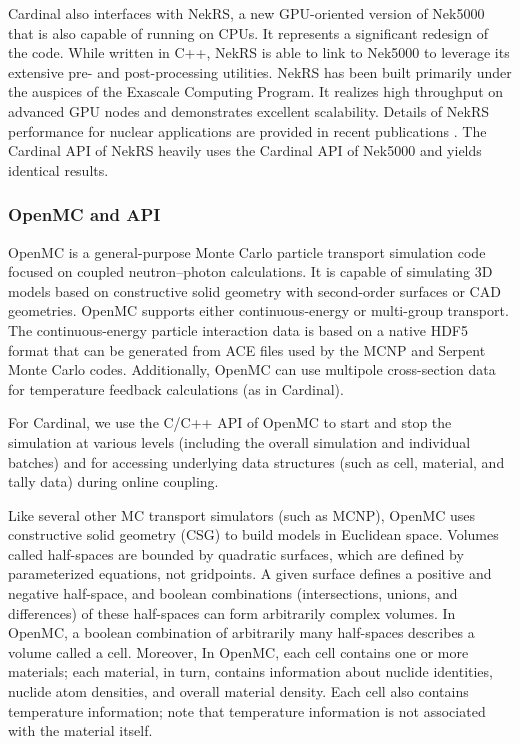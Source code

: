 Cardinal also interfaces with NekRS, a new GPU-oriented version of Nek5000
that is also capable of running on CPUs. It represents a significant redesign
of the code.  While written in C++, NekRS is able to link to Nek5000 to
leverage its extensive pre- and post-processing utilities.  NekRS has been
built primarily under the auspices of the Exascale Computing Program. It
realizes high throughput on advanced GPU nodes and demonstrates excellent
scalability.  Details of NekRS performance for nuclear applications are
provided in recent publications \cite{merzari2020toward}. The Cardinal API of
NekRS heavily uses the Cardinal API of Nek5000 and yields identical results.


\subsubsection{OpenMC and API}

OpenMC \cite{romano2015openmc} is a general-purpose Monte Carlo particle transport simulation code focused on coupled neutron--photon calculations. It is
capable of simulating 3D models based on constructive solid geometry with second-order surfaces or CAD geometries. OpenMC
supports either continuous-energy or multi-group transport. The continuous-energy particle interaction data
is based on a native HDF5 format that can be generated from ACE files used by the MCNP and Serpent
Monte Carlo codes. Additionally, OpenMC can use multipole cross-section data for temperature feedback
calculations (as in Cardinal).

For Cardinal, we use the C/C++ API of OpenMC to start and stop the simulation at various levels (including the overall
simulation and individual batches) and for accessing underlying data structures (such as cell, material, and
tally data) during online coupling.

Like several other MC transport simulators (such as MCNP), OpenMC uses constructive solid geometry (CSG) to build models in Euclidean space.
Volumes called half-spaces are bounded by quadratic surfaces, which are defined by parameterized equations, not gridpoints. A given surface defines a positive and negative half-space, and boolean combinations (intersections, unions, and differences) of these half-spaces can form arbitrarily complex volumes. In OpenMC, a boolean combination of arbitrarily many half-spaces describes a volume called a cell. Moreover, In OpenMC, each cell contains one or more materials; each material, in turn, contains information about nuclide identities, nuclide atom densities, and overall material density. Each cell also contains temperature information; note that temperature information is not associated with the material itself.

